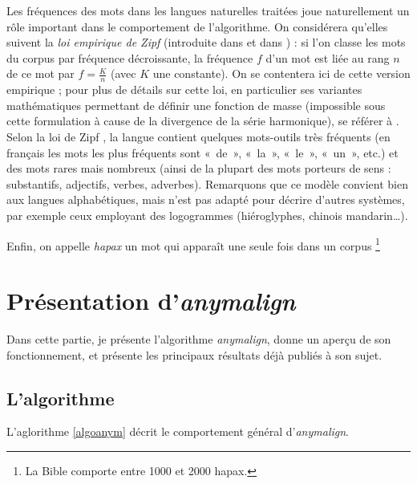 \documentclass[a4paper,10pt]{article}
\newcommand{\anym}{\emph{anymalign}}
\newcommand{\guill}[1]{«~#1~»}
\begin{document}
Les fréquences des mots dans les langues naturelles traitées joue naturellement un rôle important dans le comportement de l'algorithme. On considérera qu'elles suivent la \emph{loi empirique de Zipf} (introduite dans \cite{zipf1935psycho} et dans \cite{zipf1949human})
: si l'on classe les mots du corpus par fréquence décroissante, la fréquence $f$ d'un mot est liée au rang $n$ de ce mot par $f = \frac{K}{n}$ (avec $K$ une constante). On se contentera ici de cette version empirique ; pour plus de détails sur cette loi, en particulier ses variantes mathématiques permettant de définir une fonction de masse (impossible sous cette formulation à cause de la divergence de la série harmonique), se référer à \cite{baayen2001word}. Selon la loi de Zipf , la langue contient quelques mots-outils très fréquents (en français les mots les plus fréquents sont \guill{de}, \guill{la}, \guill{le}, \guill{un}, etc.) et des mots rares mais nombreux (ainsi de la plupart des mots porteurs de sens : substantifs, adjectifs, verbes, adverbes). Remarquons que ce modèle convient bien aux langues alphabétiques, mais n'est pas adapté pour décrire d'autres systèmes, par exemple ceux employant des logogrammes (hiéroglyphes, chinois mandarin\dots).

Enfin, on appelle \emph{hapax} un mot qui apparaît une seule fois dans un corpus  \footnote{La Bible comporte entre 1000 et 2000 hapax.}



\section{Présentation d'\emph{anymalign}}

Dans cette partie, je présente l'algorithme \anym, donne un aperçu de son fonctionnement, et présente les principaux résultats déjà publiés à son sujet.

\subsection{L'algorithme}

L'aglorithme \ref{algoanym} décrit le comportement général d'\anym.
\end{document}
